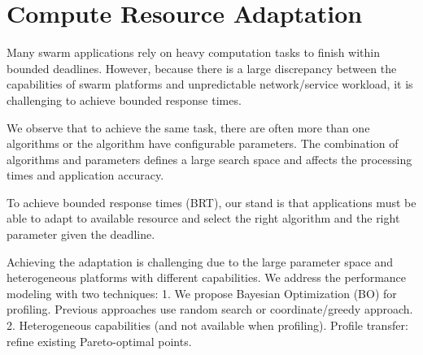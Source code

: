 \documentclass[thesis.tex]{subfiles}
\begin{document}
\chapter{Compute Resource Adaptation}
\label{cha:comp-reso-adapt}

Many swarm applications rely on heavy computation tasks to finish within bounded
deadlines. However, because there is a large discrepancy between the
capabilities of swarm platforms and unpredictable network/service workload, it
is challenging to achieve bounded response times.

We observe that to achieve the same task, there are often more than one
algorithms or the algorithm have configurable parameters. The combination of
algorithms and parameters defines a large search space and affects the
processing times and application accuracy.

To achieve bounded response times (BRT), our stand is that applications must be
able to adapt to available resource and select the right algorithm and the right
parameter given the deadline.

Achieving the adaptation is challenging due to the large parameter space and
heterogeneous platforms with different capabilities. We address the performance
modeling with two techniques: 1. We propose Bayesian Optimization (BO) for
profiling. Previous approaches use random search or coordinate/greedy
approach. 2. Heterogeneous capabilities (and not available when
profiling). Profile transfer: refine existing Pareto-optimal points.








\end{document}
